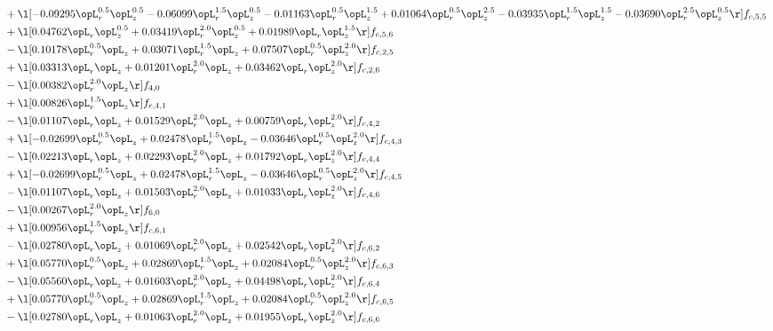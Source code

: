 \begin{alignat}{2}
& + \l[  -0.09295 \opL_r^{0.5} \opL_z^{0.5}   -0.06099 \opL_r^{1.5} \opL_z^{0.5}   -0.01163 \opL_r^{0.5} \opL_z^{1.5} +  0.01064 \opL_r^{0.5} \opL_z^{2.5}   -0.03935 \opL_r^{1.5} \opL_z^{1.5}   -0.03690 \opL_r^{2.5} \opL_z^{0.5}  \r] f_{c,5,5} \nonumber \\ 
& + \l[  0.04762 \opL_r \opL_z^{0.5} +  0.03419 \opL_r^{2.0} \opL_z^{0.5} +  0.01989 \opL_r \opL_z^{1.5}  \r] f_{c,5,6} \nonumber \\ 
& - \l[  0.10178 \opL_r^{0.5} \opL_z +  0.03071 \opL_r^{1.5} \opL_z +  0.07507 \opL_r^{0.5} \opL_z^{2.0}  \r] f_{c,2,5} \nonumber \\ 
& + \l[  0.03313 \opL_r \opL_z +  0.01201 \opL_r^{2.0} \opL_z +  0.03462 \opL_r \opL_z^{2.0}  \r] f_{c,2,6} \nonumber \\ 
& - \l[  0.00382 \opL_r^{2.0} \opL_z  \r] f_{4,0} \nonumber \\ 
& + \l[  0.00826 \opL_r^{1.5} \opL_z  \r] f_{c,4,1} \nonumber \\ 
& - \l[  0.01107 \opL_r \opL_z +  0.01529 \opL_r^{2.0} \opL_z +  0.00759 \opL_r \opL_z^{2.0}  \r] f_{c,4,2} \nonumber \\ 
& + \l[  -0.02699 \opL_r^{0.5} \opL_z +  0.02478 \opL_r^{1.5} \opL_z   -0.03646 \opL_r^{0.5} \opL_z^{2.0}  \r] f_{c,4,3} \nonumber \\ 
& - \l[  0.02213 \opL_r \opL_z +  0.02293 \opL_r^{2.0} \opL_z +  0.01792 \opL_r \opL_z^{2.0}  \r] f_{c,4,4} \nonumber \\ 
& + \l[  -0.02699 \opL_r^{0.5} \opL_z +  0.02478 \opL_r^{1.5} \opL_z   -0.03646 \opL_r^{0.5} \opL_z^{2.0}  \r] f_{c,4,5} \nonumber \\ 
& - \l[  0.01107 \opL_r \opL_z +  0.01503 \opL_r^{2.0} \opL_z +  0.01033 \opL_r \opL_z^{2.0}  \r] f_{c,4,6} \nonumber \\ 
& - \l[  0.00267 \opL_r^{2.0} \opL_z  \r] f_{6,0} \nonumber \\ 
& + \l[  0.00956 \opL_r^{1.5} \opL_z  \r] f_{c,6,1} \nonumber \\ 
& - \l[  0.02780 \opL_r \opL_z +  0.01069 \opL_r^{2.0} \opL_z +  0.02542 \opL_r \opL_z^{2.0}  \r] f_{c,6,2} \nonumber \\ 
& + \l[  0.05770 \opL_r^{0.5} \opL_z +  0.02869 \opL_r^{1.5} \opL_z +  0.02084 \opL_r^{0.5} \opL_z^{2.0}  \r] f_{c,6,3} \nonumber \\ 
& - \l[  0.05560 \opL_r \opL_z +  0.01603 \opL_r^{2.0} \opL_z +  0.04498 \opL_r \opL_z^{2.0}  \r] f_{c,6,4} \nonumber \\ 
& + \l[  0.05770 \opL_r^{0.5} \opL_z +  0.02869 \opL_r^{1.5} \opL_z +  0.02084 \opL_r^{0.5} \opL_z^{2.0}  \r] f_{c,6,5} \nonumber \\ 
& - \l[  0.02780 \opL_r \opL_z +  0.01063 \opL_r^{2.0} \opL_z +  0.01955 \opL_r \opL_z^{2.0}  \r] f_{c,6,6} \nonumber \\ 
\end{alignat} 



